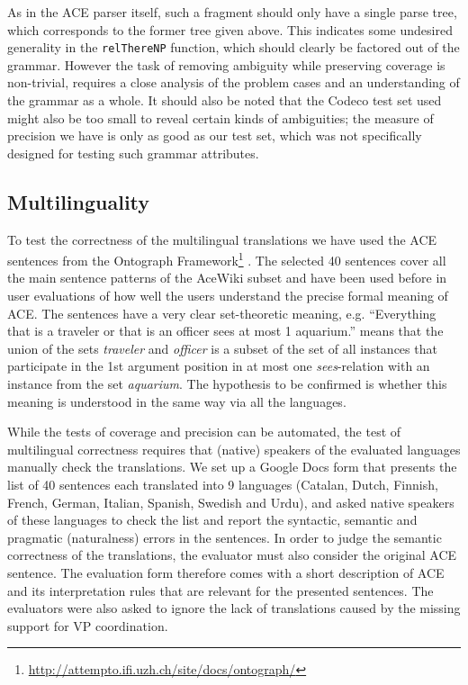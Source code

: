\documentclass[a4paper]{article}
\begin{document}
As in the ACE parser itself, such a fragment should only have a single
parse tree, which corresponds to the former tree given above. This
indicates some undesired generality in the \verb|relThereNP| function,
which should clearly be factored out of the grammar. However the task
of removing ambiguity while preserving coverage is non-trivial,
requires a close analysis of the problem cases and an understanding of
the grammar as a whole.
It should also be noted that the Codeco test set used might also be
too small to reveal certain kinds of ambiguities; the measure of precision we 
have is only as good as our test set, which was not specifically designed for
testing such grammar attributes.

\subsection{Multilinguality}

To test the correctness of the multilingual translations we have used
the ACE sentences from the
Ontograph
Framework\footnote{\url{http://attempto.ifi.uzh.ch/site/docs/ontograph/}}
\cite{kuhn2009cnlmain}. The selected 40 sentences cover all the main sentence
patterns of the AceWiki subset and have been used before in user
evaluations of how well the users understand the precise formal meaning of ACE.
The sentences have a very clear set-theoretic meaning, e.g.
``Everything that is a traveler or that is an officer sees
at most 1 aquarium.'' means that the union of the sets \emph{traveler} and
\emph{officer} is a subset of the set of all instances that participate in
the 1st argument position in at most one \emph{sees}-relation with an
instance from the set \emph{aquarium}.
The hypothesis to be confirmed is whether this meaning is understood in
the same way via all the languages.

While the tests of coverage and precision can be automated, the test of
multilingual correctness requires that (native) speakers of the evaluated
languages manually check the translations. We set up a Google Docs form that
presents the list of 40 sentences each translated into 9 languages
(Catalan, Dutch, Finnish, French, German, Italian, Spanish, Swedish and Urdu),
and asked native speakers of these languages to check the list and report
the syntactic, semantic and pragmatic (naturalness) errors in the sentences.
In order to judge the semantic correctness of the translations, the
evaluator must also consider the original ACE sentence. The evaluation form
therefore comes with a short description of ACE and its interpretation rules
that are relevant for the presented sentences.
The evaluators were also asked to ignore the lack of translations caused by
the missing support for VP coordination.
\end{document}
